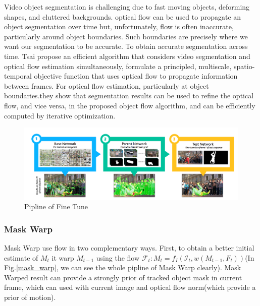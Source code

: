 Video object segmentation is challenging due to fast moving objects, deforming shapes, and cluttered backgrounds. optical flow can be used to propagate an object segmentation over time but, unfortunately, flow is often inaccurate, particularly around object boundaries. Such boundaries are precisely where we want our segmentation to be accurate. To obtain accurate segmentation across time.  Tsai \etal propose an efficient algorithm\cite{OFL}  that considers video segmentation and optical flow estimation simultaneously, formulate a principled, multiscale, spatio-temporal objective function that uses optical flow to propagate information between frames. For optical flow estimation, particularly at object boundaries.they show that segmentation results can be used to refine the optical flow, and vice versa, in the proposed object flow algorithm, and can be efficiently computed by iterative optimization.


\begin{figure}
    \begin{center}
        \includegraphics[width=\textwidth]{figure/fine_tune.png}
    \end{center}
    \caption{Pipline of Fine Tune}
    \label{fine_tune}
\end{figure}


\subsubsection{Mask Warp}
Mask Warp\cite{LucidTracker} use flow in two complementary ways. First, to obtain a better initial estimate of $M_t$ it warp $M_{t-1}$ using the flow $\mathcal{F}_t : M_t = f_I (\mathcal{I}_t , w(M_{t-1} , F_{t}))$(In Fig.\ref{mask_warp}, we can see the whole pipline of Mask Warp clearly). Mask Warped result can provide a strongly prior of tracked object mask in current frame, which can used with current image and optical flow norm(which provide a prior of motion).

